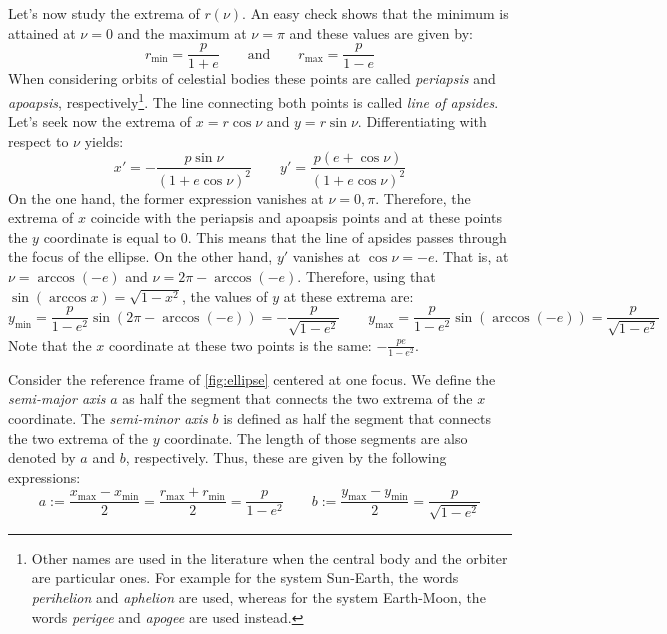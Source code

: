 \documentclass[../main.tex]{subfiles}
\begin{document}
Let's now study the extrema of $r(\nu)$. An easy check shows that the minimum is attained at $\nu=0$ and the maximum at $\nu=\pi$ and these values are given by:
\begin{equation}
  r_\mathrm{min}=\frac{p}{1+e}\qquad\text{and}\qquad r_\mathrm{max}=\frac{p}{1-e}
\end{equation}
When considering orbits of celestial bodies these points are called \emph{periapsis} and \emph{apoapsis}, respectively\footnote{Other names are used in the literature when the central body and the orbiter are particular ones. For example for the system Sun-Earth, the words \emph{perihelion} and \emph{aphelion} are used, whereas for the system Earth-Moon, the words \emph{perigee} and \emph{apogee} are used instead.}. The line connecting both points is called \emph{line of apsides}. Let's seek now the extrema of $x = r\cos\nu$ and $y = r\sin\nu$. Differentiating with respect to $\nu$ yields:
\begin{equation}
  x'=-\frac{p\sin\nu}{{(1+e\cos\nu)}^2}\qquad y'=\frac{p(e+\cos\nu)}{{(1+e\cos\nu)}^2}
\end{equation}
On the one hand, the former expression vanishes at $\nu=0,\pi$. Therefore, the extrema of $x$ coincide with the periapsis and apoapsis points and at these points the $y$ coordinate is equal to 0. This means that the line of apsides passes through the focus of the ellipse. On the other hand, $y'$ vanishes at $\cos\nu=-e$. That is, at $\nu=\arccos (-e)$ and $\nu=2\pi-\arccos(-e)$. Therefore, using that $\sin(\arccos x)=\sqrt{1-x^2}$, the values of $y$ at these extrema are:
\begin{equation}
  y_\mathrm{min}=\frac{p}{1-e^2}\sin(2\pi-\arccos(-e))=-\frac{p}{\sqrt{1-e^2}}\qquad y_\mathrm{max}=\frac{p}{1-e^2}\sin(\arccos(-e))=\frac{p}{\sqrt{1-e^2}}
\end{equation}
Note that the $x$ coordinate at these two points is the same: $\displaystyle-\frac{pe}{1-e^2}$.
\begin{definition}
  Consider the reference frame of \cref{fig:ellipse} centered at one focus. We define the \emph{semi-major axis} $a$ as half the segment that connects the two extrema of the $x$ coordinate. The \emph{semi-minor axis} $b$ is defined as half the segment that connects the two extrema of the $y$ coordinate. The length of those segments are also denoted by $a$ and $b$, respectively. Thus, these are given by the following expressions:
  \begin{equation}
    a:=\frac{x_\mathrm{max}-x_\mathrm{min}}{2}=\frac{r_\mathrm{max}+r_\mathrm{min}}{2}=\frac{p}{1-e^2}\qquad b:=\frac{y_\mathrm{max}-y_\mathrm{min}}{2}=\frac{p}{\sqrt{1-e^2}}
  \end{equation}
\end{definition}
\end{document}
